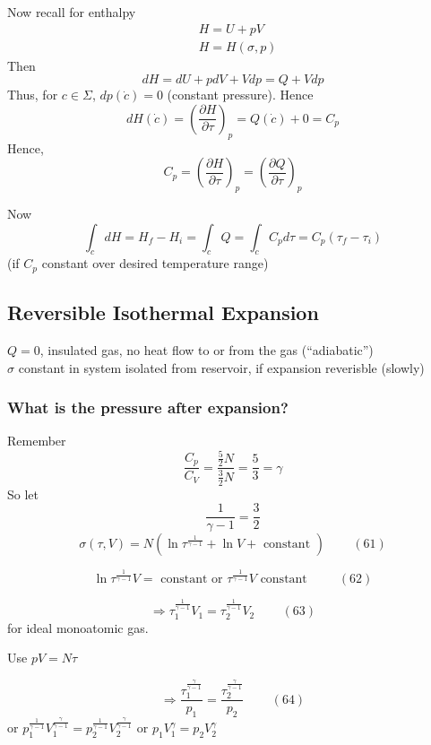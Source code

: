\documentclass[twoside]{amsart}
\theoremstyle{plain}
\theoremstyle{definition}
\begin{document}
Now recall for enthalpy 
\[
\begin{aligned}
  & H = U+ pV \\ 
  & H = H(\sigma, p)
\end{aligned}
\]
Then
\[
dH = dU+ pdV + Vdp = Q + Vdp 
\]
Thus, for $c\in \Sigma$, $dp(\dot{c})=0$ (constant pressure).  Hence
\[
dH(\dot{c}) = \left( \frac{ \partial H}{ \partial \tau} \right)_p = Q(\dot{c})  +  0 = C_p
\]
Hence, 
\[
C_p = \left( \frac{ \partial H}{ \partial \tau } \right)_p = \left( \frac{ \partial Q}{ \partial \tau} \right)_p
\]

Now
\[
\int_c dH = H_f - H_i = \int_c Q = \int_c C_p d\tau = C_p(\tau_f - \tau_i)
\]
(if $C_p$ constant over desired temperature range)



\subsection*{Reversible Isothermal Expansion}

$Q=0$, insulated gas, no heat flow to or from the gas (``adiabatic'') \\
$\sigma$ constant in system isolated from reservoir, if expansion reverisble (slowly)

\subsubsection*{What is the pressure after expansion?}

Remember 
\[
\frac{C_p}{C_V} = \frac{ \frac{5}{2} N }{ \frac{3}{2} N } = \frac{5}{3} = \gamma 
\]
So let 
\[
\frac{1}{\gamma- 1} = \frac{3}{2}
\]
\begin{equation}
  \sigma(\tau,V) = N ( \ln{ \tau^{\frac{1}{ \gamma - 1 } } + \ln{V} + \text{ constant } } ) \quad \quad \, (61)
\end{equation}

\begin{equation}
  \ln{ \tau^{\frac{1}{ \gamma -1 } }V} = \text{ constant or } \tau^{ \frac{1}{\gamma-1}}V \text{ constant } \quad \quad \, (62)
\end{equation}

\begin{equation}
  \Longrightarrow \tau_1^{\frac{1}{\gamma-1}}V_1 = \tau_2^{\frac{1}{\gamma-1}}V_2 \quad \quad \, (63)
\end{equation}
for ideal monoatomic gas.  

Use $pV = N\tau$

\begin{equation}
\Longrightarrow \frac{ \tau_1^{\frac{\gamma}{\gamma-1}} }{p_1} = \frac{ \tau_2^{\frac{\gamma}{\gamma-1}} }{p_2} \quad \quad \, (64)
\end{equation}
or $p_1^{\frac{1}{\gamma-1}}V_1^{\frac{\gamma}{\gamma-1}} = p_2^{\frac{1}{\gamma-1}}V_2^{\frac{\gamma}{\gamma-1}}$ or $p_1V_1^{\gamma} = p_2 V_2^{\gamma}$
\end{document}
